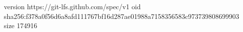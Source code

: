 version https://git-lfs.github.com/spec/v1
oid sha256:f378a0f56d6a8afd111767bf16d287ae01988a7158356583c973739808699903
size 174916
